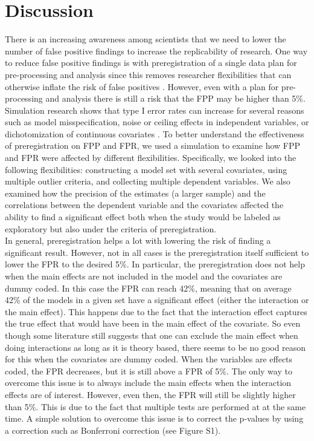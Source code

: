 \section{Discussion}
There is an increasing awareness among scientists that we need to  lower the number of false positive findings to increase the replicability of research. One way to reduce false positive findings is with preregistration of a single data plan for pre-processing and analysis since this removes researcher flexibilities that can otherwise inflate the risk of false positives \citep{Simmons2011}. However, even with a plan for pre-processing and analysis there is still a risk that the FPP may be higher than 5\%. Simulation research shows that type I error rates can increase for several reasons such as model misspecification, noise or ceiling effects in independent variables, or dichotomization of continuous covariates \citep{Dennis2019, Litiere2007, Brunner2009, Austin2003, Austin2004}. To better understand the effectiveness of preregistration on FPP and FPR, we used a simulation to examine how FPP and FPR were affected by different flexibilities. Specifically, we looked into the following flexibilities: constructing a model set with several covariates, using multiple outlier criteria, and collecting multiple dependent variables. We also examined how the precision of the estimates (a larger sample) and the correlations between the dependent variable and the covariates affected the ability to find a significant effect both when the study would be labeled as exploratory but also under the criteria of preregistration. \\

In general, preregistration helps a lot with lowering the risk of finding a significant result. However, not in all cases is the preregistration itself sufficient to lower the FPR to the desired 5\%. In particular, the preregistration does not help when the main effects are not included in the model and the covariates are dummy coded. In this case the FPR can reach 42\%, meaning that on average 42\% of the models in a given set have a significant effect (either the interaction or the main effect). This happens due to the fact that the interaction effect captures the true effect that would have been in the main effect of the covariate. So even though some literature still suggests that one can exclude the main effect when doing interactions as long as it is theory based, there seems to be no good reason for this when the covariates are dummy coded. When the variables are effects coded, the FPR decreases, but it is still above a FPR of 5\%. The only way to overcome this issue is to always include the main effects when the interaction effects are of interest. However, even then, the FPR will still be slightly higher than 5\%. This is due to the fact that multiple tests are performed at at the same time. A simple solution to overcome this issue is to correct the p-values by  using a correction such as Bonferroni correction \citep{dunn1961multiple} (see Figure S1).  \\

